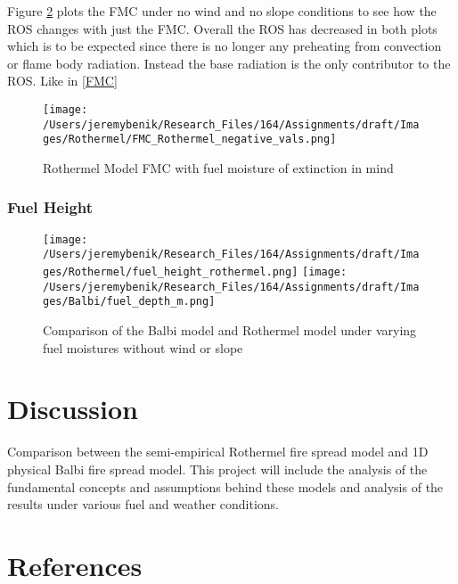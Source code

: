 \documentclass{article}
\begin{document}
\indent Figure \ref{balbi_vs_rother_fmc_no_wind_no_slope} plots the FMC under no wind and no slope conditions to see how the ROS changes with just the FMC. Overall the ROS has decreased in both plots which is to be expected since there is no longer any preheating from convection or flame body radiation. Instead the base radiation is the only contributor to the ROS. Like in \ref{FMC}

\begin{figure}
\centering
  \texttt{[image: /Users/jeremybenik/Research\_Files/164/Assignments/draft/Images/Rothermel/FMC\_Rothermel\_negative\_vals.png]}
  \caption{Rothermel Model FMC with fuel moisture of extinction in mind}
  \label{rothermel_neg}
\end{figure}





\subsubsection{Fuel Height}
\begin{figure}
\centering
  \texttt{[image: /Users/jeremybenik/Research\_Files/164/Assignments/draft/Images/Rothermel/fuel\_height\_rothermel.png]}
  \texttt{[image: /Users/jeremybenik/Research\_Files/164/Assignments/draft/Images/Balbi/fuel\_depth\_m.png]}
  \caption{Comparison of the Balbi model and Rothermel model under varying fuel moistures without wind or slope}
  \label{balbi_vs_rother_fmc_no_wind_no_slope}
\end{figure}






















\section{Discussion}




Comparison between the semi-empirical Rothermel fire spread model and 1D physical Balbi fire spread model. This project will include the analysis of the fundamental concepts and assumptions behind these models and analysis of the results under various fuel and weather conditions.











\section{References}
\end{document}
